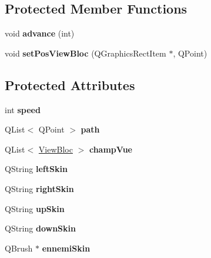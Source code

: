 \subsection*{Protected Member Functions}
\begin{DoxyCompactItemize}
\item 
\hypertarget{class_ennemi_afc6832bb7b5969ac0e13f87c643a5ce2}{}void {\bfseries advance} (int)\label{class_ennemi_afc6832bb7b5969ac0e13f87c643a5ce2}

\item 
\hypertarget{class_ennemi_ad68ed78a65bdade39ff0b1b55a190240}{}void {\bfseries set\+Pos\+View\+Bloc} (Q\+Graphics\+Rect\+Item $\ast$, Q\+Point)\label{class_ennemi_ad68ed78a65bdade39ff0b1b55a190240}

\end{DoxyCompactItemize}
\subsection*{Protected Attributes}
\begin{DoxyCompactItemize}
\item 
\hypertarget{class_ennemi_abf051ea1d034df4a8b0480e9387f2008}{}int {\bfseries speed}\label{class_ennemi_abf051ea1d034df4a8b0480e9387f2008}

\item 
\hypertarget{class_ennemi_a4ddf1ae5a5662a8206dc6f4a3aac6fbf}{}Q\+List$<$ Q\+Point $>$ {\bfseries path}\label{class_ennemi_a4ddf1ae5a5662a8206dc6f4a3aac6fbf}

\item 
\hypertarget{class_ennemi_ab6afa5e2cd63928656532a8c99fe64f8}{}Q\+List$<$ \hyperlink{struct_view_bloc}{View\+Bloc} $>$ {\bfseries champ\+Vue}\label{class_ennemi_ab6afa5e2cd63928656532a8c99fe64f8}

\item 
\hypertarget{class_ennemi_a5537ad37a49d572d09a76749238490c2}{}Q\+String {\bfseries left\+Skin}\label{class_ennemi_a5537ad37a49d572d09a76749238490c2}

\item 
\hypertarget{class_ennemi_ab63f4a7fbff796d8c368bd49e254561a}{}Q\+String {\bfseries right\+Skin}\label{class_ennemi_ab63f4a7fbff796d8c368bd49e254561a}

\item 
\hypertarget{class_ennemi_abe2b3007be5ed71b5547a66407b8db3e}{}Q\+String {\bfseries up\+Skin}\label{class_ennemi_abe2b3007be5ed71b5547a66407b8db3e}

\item 
\hypertarget{class_ennemi_a3a72c0537216823ea706923d20f9ed5a}{}Q\+String {\bfseries down\+Skin}\label{class_ennemi_a3a72c0537216823ea706923d20f9ed5a}

\item 
\hypertarget{class_ennemi_afed643ae9412716c1f1caabfdea06fc0}{}Q\+Brush $\ast$ {\bfseries ennemi\+Skin}\label{class_ennemi_afed643ae9412716c1f1caabfdea06fc0}

\end{DoxyCompactItemize}


